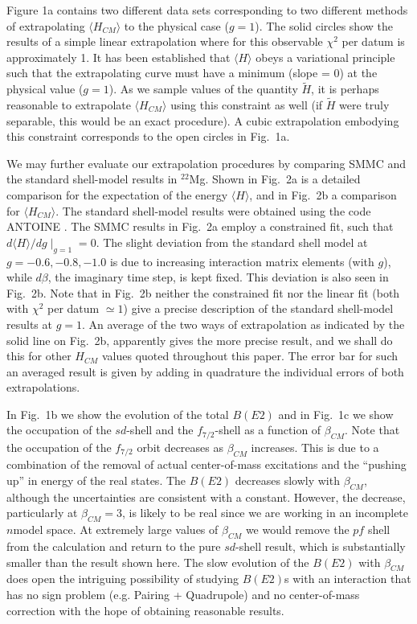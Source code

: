 \begin{multicols}{2}
Figure 1a contains two different data sets corresponding to
two different methods of extrapolating $\langle  H_{CM}\rangle $
to the  physical case ($g = 1$).
The solid circles show the results of a
simple linear extrapolation where for this
observable $\chi^2$ per datum is approximately 1.
It has been established \cite{r:smmc_pr} that
$\langle  H \rangle$ obeys a variational principle such
that the extrapolating curve must have a minimum
(slope = 0) at the physical value ($g=1$).  As we
 sample values of
the quantity ${\tilde H}$,
it is perhaps reasonable to extrapolate $\langle  H_{CM} \rangle$
using this constraint as well (if $ {\tilde H}$ were truly separable,
this would be an exact procedure).
A cubic extrapolation embodying this constraint corresponds to the
open circles in Fig.~1a.

We may further evaluate our extrapolation procedures by comparing SMMC
and the standard shell-model results in $^{22}$Mg.  Shown in
Fig.~2a is a detailed comparison for the expectation of the energy
$\langle H\rangle$, and in Fig.~2b a comparison for $\langle
H_{CM}\rangle$.  The standard shell-model results were obtained using the
code ANTOINE
\cite{r:antoine}.  The SMMC results in Fig.~2a employ a constrained
fit, such that $d\langle H\rangle/dg \mid_{g=1}=0$. The slight
deviation from the standard shell model at $g=-0.6,-0.8,-1.0$ is due to
increasing
interaction matrix elements (with $g$), while $d\beta$, the imaginary
time step, is kept fixed. This deviation is also seen in Fig.~2b. Note
that in Fig.~2b neither the constrained fit nor the linear fit (both
with $\chi^2$ per datum $\simeq 1$) give a precise description of the
standard shell-model results at $g=1$. An average
of the two ways of extrapolation as
indicated by the solid line on Fig.~2b, apparently gives the more
precise result, and we shall do this for other $H_{CM}$ values quoted
throughout this paper. The error bar for such an averaged result is given
by adding in quadrature the individual errors of both extrapolations.

In Fig.~1b we show the evolution of the total $B(E2)$  and in
Fig.~1c we show the occupation of the $sd$-shell and the
$f_{7/2}$-shell as a function of $\beta_{CM}$.  Note that the
occupation of the $f_{7/2}$ orbit decreases as $\beta_{CM}$ increases.
This is due to a combination of the removal of actual center-of-mass
excitations
and the ``pushing up'' in energy of the real states.  The $B(E2)$
decreases slowly with $\beta_{CM}$, although the uncertainties are
consistent with a constant. However, the decrease, particularly at
$\beta_{CM}=3$, is likely to be real since we are working in an
incomplete $n$\hw model space.  At extremely large values of
$\beta_{CM}$ we would remove the $pf$ shell from the calculation and
return to the pure $sd$-shell result, which is substantially smaller
than the result shown here.  The slow evolution of the $B(E2)$ with
$\beta_{CM}$ does open the intriguing possibility of studying
$B(E2)$s with an interaction that has no sign problem (e.g. Pairing +
Quadrupole) and no center-of-mass correction with the hope of obtaining
reasonable results.


\end{multicols}
